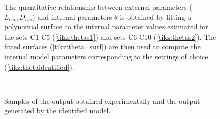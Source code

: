 \documentclass[a4paper,11pt,twoside]{article}
\def\dataset{C}
\theoremstyle{mytheoremstyle}
\begin{document}
\begin{figure}[!t]
	\centering
	\resizebox{!}{0cm}{
		\begin{minipage}{\textwidth}
		
	\end{minipage}}
	
	\caption{The quantitative relationship between external parameters ($L_{cut}, D_{rlx}$) and internal parameters $\theta$ is obtained by fitting a polynomial surface to the internal parameter values estimated for the sets \dataset1-\dataset5 (\ref{tikz:thetas1}) and sets \dataset6-\dataset10 (\ref{tikz:thetas2}). The fitted surfaces (\ref{tikz:theta_surf}) are then used to compute the internal model parameters corresponding to the settings of choice (\ref{tikz:thetaidentified}).}\label{fig:surfaces_all}
\end{figure}
\begin{figure}[!t]
	\centering
	\subfloat[\dataset3]{\label{fig:c3all}}\\
	\subfloat[\dataset8]{\label{fig:c8all}}
	\caption{Samples of the output obtained experimentally and the output generated by the identified model.}\label{fig:Callout}
\end{figure}
\end{document}
